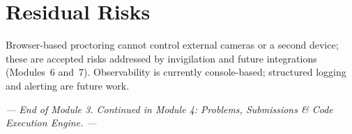 \documentclass[12pt,a4paper,oneside]{report}
\begin{document}
\section{Residual Risks}
Browser-based proctoring cannot control external cameras or a second device;
these are accepted risks addressed by invigilation and future integrations
(Modules~6 and~7). Observability is currently console-based; structured logging
and alerting are future work.

\vspace{0.6cm}
\begin{center}
\textit{--- End of Module 3. Continued in Module 4: Problems, Submissions \& Code Execution Engine. ---}
\end{center}
\end{document}
